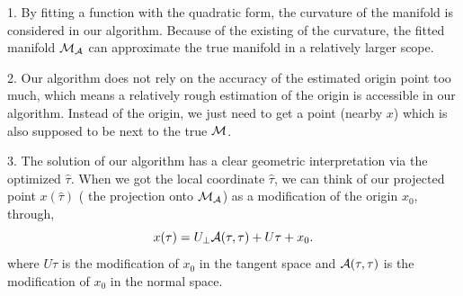 \documentclass{article}
\theoremstyle{remark}
\begin{document}
1. By fitting a function with the quadratic form, the curvature of the manifold is considered in our algorithm. Because of the existing of the curvature, the fitted manifold ${\cal M}_{\cal A}$ can approximate the true manifold in a relatively larger scope.

2. Our algorithm does not rely on the accuracy of the estimated origin point too much, which means a relatively rough estimation of the origin is accessible in our algorithm. Instead of the origin, we just need to get a point (nearby $x$) which is also supposed to be next to the true $\cal M$.

3. The solution of our algorithm has a clear geometric interpretation via the optimized $\hat{\tau}$.  When we got the local coordinate $\hat{\tau}$, we can think of our projected point $x(\hat{\tau})$ ( the projection onto ${\cal M}_{\cal A}$) as a modification of the origin $x_0$, through,
\[
x(\tau) = U_\perp {\cal A}(\tau,\tau) + U\tau + x_0. 
\]
where $U\tau$ is the modification of $x_0$ in the tangent space and ${\cal A}(\tau,\tau)$ is the modification of $x_0$ in the normal space.
\end{document}
